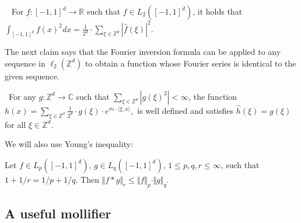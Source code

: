 \begin{claim}~\label{clm:Parseval}
For $f: [-1,1]^d \rightarrow \mathbb{R}$ such that $f \in L_2( [-1,1]^d)$, it holds that
$
 \int_{ [-1,1]^d} f(x)^2 dx = \frac{1}{2^d} \cdot \sum_{\xi  \in \mathbb{Z}^d} |\widehat{f}(\xi)|^2. 
$
\end{claim}
The next claim says that the Fourier inversion formula can be applied to any sequence in $\ell_2(\mathbb{Z}^d)$ to obtain a function whose Fourier series is identical to the given sequence. 
\begin{claim} \label{clm:inversion}\
For any $g: \mathbb{Z}^d \rightarrow \mathbb{C}$ such that $\sum_{\xi \in \mathbb{Z}^d} |{g}(\xi)^2| <\infty$, the function
$
h(x) = \sum_{\xi \in \mathbb{Z}^d} \frac{1}{2^d} \cdot g(\xi) \cdot e^{ \pi i \cdot \langle \xi, x \rangle},
$
is well defined and satisfies $\widehat{h}(\xi) = g(\xi)$ for all $\xi \in \mathbb{Z}^d$. \end{claim}
We will also use Young's inequality: 
\begin{claim} \label{clm:Young}
Let $f \in L_p([-1,1]^d)$, $g \in L_q([-1,1]^d)$, $1 \le p,q ,r \le \infty$, 
such that $1 + 1/r = 1/p + 1/q$. Then $\Vert f \ast g \Vert_r \le \Vert f \Vert_p \cdot \Vert g \Vert_q$. 
\end{claim}

\subsection{A useful mollifier} \label{sec:mollifier}


